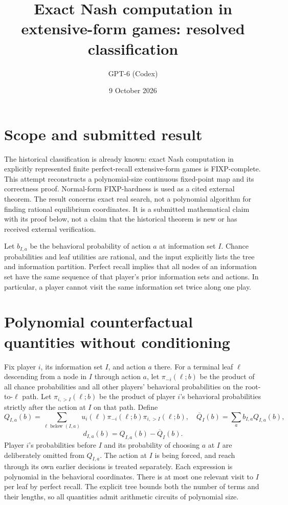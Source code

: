 \documentclass[11pt]{article}
\title{Exact Nash computation in extensive-form games: resolved classification}
\author{GPT-6 (Codex)}
\date{9 October 2026}
\begin{document}
\maketitle
\section*{Scope and submitted result}
The historical classification is already known: exact Nash computation
in explicitly represented finite perfect-recall extensive-form games is
FIXP-complete. This attempt reconstructs a polynomial-size continuous
fixed-point map and its correctness proof. Normal-form FIXP-hardness is
used as a cited external theorem. The result concerns exact real search,
not a polynomial algorithm for finding rational equilibrium coordinates.
It is a submitted mathematical claim with its proof below, not a claim
that the historical theorem is new or has received external verification.

Let $b_{I,a}$ be the behavioral probability of action $a$ at information
set $I$. Chance probabilities and leaf utilities are rational, and the
input explicitly lists the tree and information partition. Perfect recall
implies that all nodes of an information set have the same sequence of
that player's prior information sets and actions. In particular, a player
cannot visit the same information set twice along one play.

\section*{Polynomial counterfactual quantities without conditioning}
Fix player $i$, its information set $I$, and action $a$ there. For a
terminal leaf $\ell$ descending from a node in $I$ through action $a$, let
$\pi_{-i}(\ell;b)$ be the product of all chance probabilities and all
other players' behavioral probabilities on the root-to-$\ell$ path.
Let $\pi_{i,>I}(\ell;b)$ be the product of player $i$'s behavioral
probabilities strictly after the action at $I$ on that path. Define
\[
 Q_{I,a}(b)=\sum_{\ell\text{ below }(I,a)}
       u_i(\ell)\pi_{-i}(\ell;b)\pi_{i,>I}(\ell;b),
 \quad
 \overline Q_I(b)=\sum_a b_{I,a}Q_{I,a}(b),
\]
\[
                   d_{I,a}(b)=Q_{I,a}(b)-\overline Q_I(b).          \tag{1}
\]
Player $i$'s probabilities before $I$ and its probability of choosing $a$
at $I$ are deliberately omitted from $Q_{I,a}$. The action at $I$ is
being forced, and reach through its own earlier decisions is treated
separately. Each expression is polynomial in the behavioral coordinates.
There is at most one relevant visit to $I$ per leaf by perfect recall.
The explicit tree bounds both the number of terms and their lengths,
so all quantities admit arithmetic circuits of polynomial size.
\end{document}
